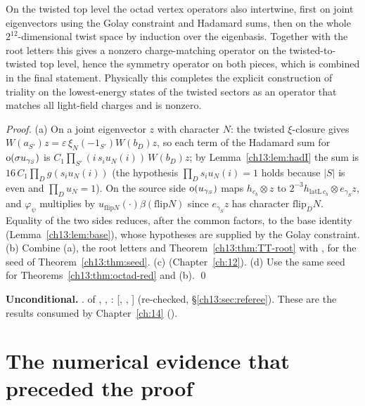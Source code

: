 \begin{physics}
On the twisted top level the octad vertex operators also intertwine, first on joint eigenvectors using the Golay constraint and Hadamard sums, then on the whole $2^{12}$-dimensional twist space by induction over the eigenbasis. Together with the root letters this gives a nonzero charge-matching operator on the twisted-to-twisted top level, hence the symmetry operator on both pieces, which is combined in the final statement. Physically this completes the explicit construction of triality on the lowest-energy states of the twisted sectors as an operator that matches all light-field charges and is nonzero.
\end{physics}
\noindent\emph{Proof.} (a) On a joint eigenvector $z$ with character $N$: the twisted $\xi$-closure gives
$W(a_{S'})z=\varepsilon\,\xi_N(-1_{S'})W(b_D)z$, so each term of the Hadamard sum for $\operatorname{o}(\sigma u_{\gamma_S})$ is
$C_1\prod_{S'}(i\,s_iu_N(i))\,W(b_D)z$; by Lemma~\ref{ch13:lem:hadI} the sum is $16\,C_1\prod_Dg(s_iu_N(i))$
(the hypothesis $\prod_Ds_iu_N(i)=1$ holds because $|S|$ is even and $\prod_Du_N=1$). On the source side
$\operatorname{o}(u_{\gamma_S})$ maps $h_{c_b}\otimes z$ to $2^{-3}h_{\mathrm{latL}\,c_b}\otimes e_{\gamma_S}z$, and $\varphi_\psi$ multiplies by
$u_{\mathrm{flip}N}(\cdot)\beta(\mathrm{flip}N)$ since $e_{\gamma_S}z$ has character $\mathrm{flip}_DN$. Equality of the two sides
reduces, after the common factors, to the base identity (Lemma~\ref{ch13:lem:base}), whose hypotheses are
supplied by the Golay constraint. (b) Combine (a), the root letters and Theorem~\ref{ch13:thm:TT-root} with
, for the seed of Theorem~\ref{ch13:thm:seed}. (c) 
(Chapter~\ref{ch:12}). (d) Use the same seed for Theorems~\ref{ch13:thm:octad-red} and (b). \qed
\begin{status}
\textbf{Unconditional.} .  of ,
, : [, , ]
(re-checked, \S\ref{ch13:sec:referee}). These are the results consumed by Chapter~\ref{ch:14}
().
\end{status}

\section{The numerical evidence that preceded the proof}\label{ch13:sec:numerics}

